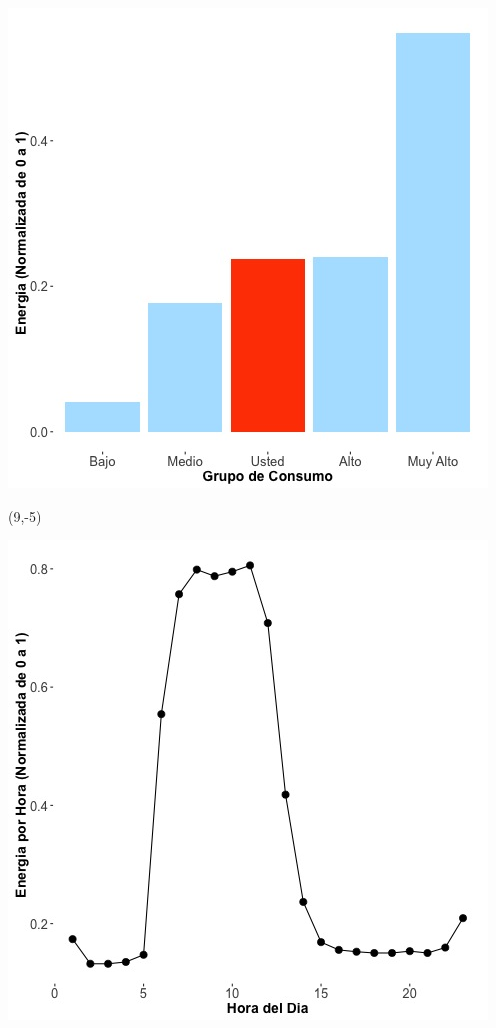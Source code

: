 \documentclass{article}\usepackage[]{graphicx}\usepackage[]{color}
\newenvironment{knitrout}{}{} %
\begin{document}
\begin{knitrout}
\color{fgcolor}
\includegraphics[scale=0.65]{figure/A28_neighbor_plot} 
\end{knitrout}

 \begin{textblock}{1}(9,-5)
\begin{minipage}{20em}
\begingroup

\endgroup
\end{minipage}
\end{textblock}


\begin{knitrout}
\color{fgcolor}
\includegraphics[scale=0.65]{figure/A28_plot_norm_median} 
\end{knitrout}
\end{document}
